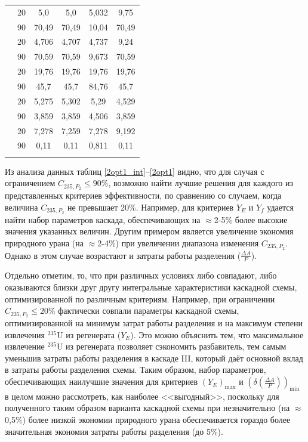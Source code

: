 \begin{table}[ht]
\begin{tabular}{|r|r||c|c|c|c|}
            & 20 & 5,0 & 5,0 & 5,032 & 9,75 \\\cline{2-6} 
            & 90 & 70,49 & 70,49 & 10,04 & 70,49\\
        \Xhline{2\arrayrulewidth}
        \multirow{2}{*}{$C_{235,W_{2}}, \%$}
            & 20 & 4,706 & 4,707 & 4,737 & 9,24 \\\cline{2-6} 
            & 90 & 70,59 & 70,59 & 9,673 & 70,59\\
    \Xhline{2\arrayrulewidth}
        \multirow{2}{*}{$C_{235,P_{2}}, \%$}
            & 20 & 19,76 & 19,76 & 19,76 & 19,76 \\\cline{2-6} 
            & 90 & 45,7 & 45,7 & 84,76 & 45,7\\
        \Xhline{2\arrayrulewidth}
        \multirow{2}{*}{$C_{235,P_{n}}, \%$}
            & 20 & 5,275 & 5,302 & 5,29 & 4,529 \\\cline{2-6} 
            & 90 & 3,859 & 3,859 & 4,506 & 3,859\\
        \Xhline{2\arrayrulewidth}           
        \multirow{2}{*}{$P_2$, кг}
            & 20 & 7,278 & 7,259 & 7,278 & 9,192 \\\cline{2-6} 
            & 90 & 0,11 & 0,11 & 0,811 & 0,11\\
\Xhline{2\arrayrulewidth}
        \end{tabular}
\end{table}

Из анализа данных таблиц \ref{2opt1_int}--\ref{2opt1} видно, что для случая с ограничением $C_{235,{P_2}} \leq 90\%$, возможно найти лучшие решения для каждого из представленных критериев эффективности, по сравнению со случаем, когда величина $C_{235,{P_2}}$ не превышает 20\%. Например, для критериев $Y_E$ и $Y_f$ удается найти набор параметров каскада, обеспечивающих на $\approx$2-5\% более высокие значения указанных величин. Другим примером является увеличение экономия природного урана (на $\approx$2-4\%) при увеличении диапазона изменения $C_{235,{P_2}}$. Однако в этом случае возрастают и затраты работы разделения ($\frac{\Delta A}{P}$).

Отдельно отметим, то, что при различных условиях либо совпадают, либо оказываются близки друг другу интегральные характеристики каскадной схемы, оптимизированной по различным критериям. Например, при ограничении $C_{235,{P_2}} \leq 20\%$ фактически совпали параметры каскадной схемы, оптимизированной на минимум затрат работы разделения и на максимум степени извлечения $^{235}$U из регенерата ($Y_E$). Это можно объяснить тем, что максимальное извлечение $^{235}$U из регенерата позволяет сэкономить разбавитель, тем самым уменьшив затраты работы разделения в каскаде III, который даёт основной вклад в затраты работы разделения схемы. Таким образом, набор параметров, обеспечивающих наилучшие значения для критериев $(Y_{E})_\text{max}$ и $(\delta(\frac{\Delta A}{P}))_\text{min}$ в целом можно рассмотреть, как наиболее <<выгодный>>, поскольку для полученного таким образом варианта каскадной схемы при незначительно (на $\approx$0,5\%) более низкой экономии природного урана обеспечивается гораздо более значительная экономия затраты работы разделения (до 5\%). 

